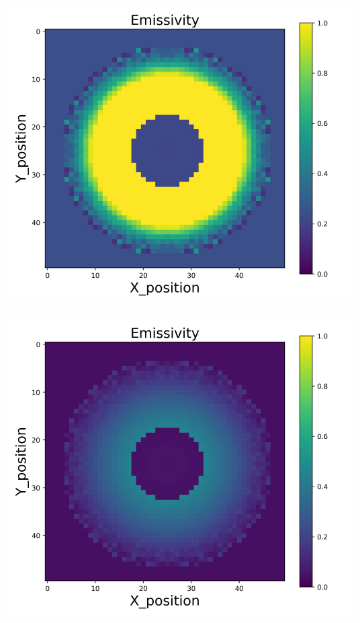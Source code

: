 {\begin{figure}[p]
\begin{minipage}{\textwidth}
\begin{subfigure}{0.325\textwidth}
        \end{subfigure}
    \end{minipage}\\
    \begin{minipage}{\textwidth}
        \centering
        \begin{subfigure}{0.325\textwidth}
            \centering
            \includegraphics[width=\textwidth]{figures/raw_data/25/exp/emi_cal.jpg}
        \end{subfigure}
        \begin{subfigure}{0.325\textwidth}
            \centering
            \includegraphics[width=\textwidth]{figures/raw_data/26/exp/emi_cal.jpg}

\end{subfigure}
\end{minipage}
\end{figure}}
